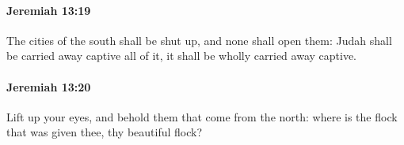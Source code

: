 		\paragraph{Jeremiah 13:19} %
			\label{JEREMIAH-13-19}

			The cities of the south shall be shut up, and none shall open them: Judah shall be carried away captive all of it, it shall be wholly carried away captive.


		\paragraph{Jeremiah 13:20} %
			\label{JEREMIAH-13-20}

			Lift up your eyes, and behold them that come from the north: where is the flock that was given thee, thy beautiful flock?


